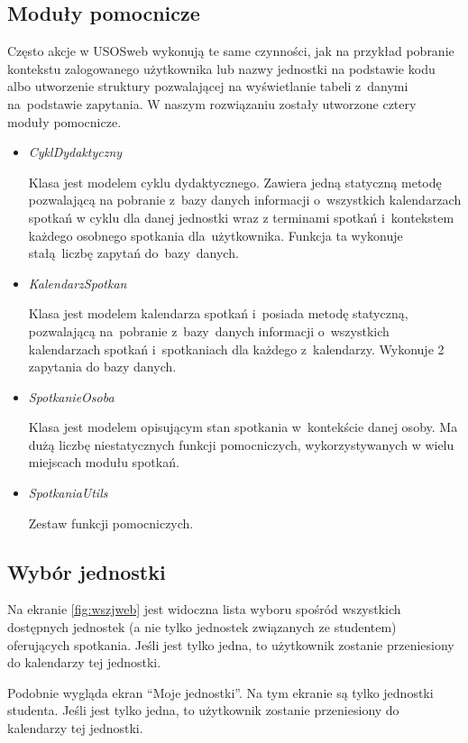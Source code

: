 \documentclass[licencjacka]{pracamgr}
\begin{document}
\subsection{Moduły pomocnicze}
Często akcje w USOSweb wykonują te same czynności, jak na przykład pobranie kontekstu zalogowanego użytkownika lub nazwy jednostki na podstawie kodu albo utworzenie struktury pozwalającej na wyświetlanie tabeli z~danymi na~podstawie zapytania.
W naszym rozwiązaniu zostały utworzone cztery moduły pomocnicze.
\begin{itemize}
\item{\textsl{CyklDydaktyczny}}

Klasa jest modelem cyklu dydaktycznego. Zawiera jedną statyczną metodę pozwalającą na pobranie z~bazy danych informacji o~wszystkich kalendarzach spotkań w cyklu dla danej jednostki wraz z terminami spotkań i~kontekstem każdego osobnego spotkania dla~użytkownika. Funkcja ta wykonuje stałą~liczbę zapytań do~bazy~danych.
\item{\textsl{KalendarzSpotkan}}

Klasa jest modelem kalendarza spotkań i~posiada metodę statyczną, pozwalającą na~pobranie z~bazy~danych informacji o~wszystkich kalendarzach spotkań i~spotkaniach dla każdego z~kalendarzy. Wykonuje 2 zapytania do bazy danych.
\item{\textsl{SpotkanieOsoba}}

Klasa jest modelem opisującym stan spotkania w~kontekście danej osoby. Ma dużą liczbę niestatycznych funkcji pomocniczych, wykorzystywanych w wielu miejscach modułu spotkań.
\item{\textsl{SpotkaniaUtils}}

Zestaw funkcji pomocniczych.
\end{itemize}

\subsection{Wybór jednostki}
Na ekranie \ref{fig:wszjweb} jest widoczna lista wyboru spośród wszystkich dostępnych jednostek (a nie tylko jednostek związanych ze studentem) oferujących spotkania. Jeśli jest tylko jedna, to użytkownik zostanie przeniesiony do kalendarzy tej jednostki. 

Podobnie wygląda ekran \enquote{Moje jednostki}. Na tym ekranie są tylko jednostki studenta. Jeśli jest tylko jedna, to użytkownik zostanie przeniesiony do kalendarzy tej jednostki.
\end{document}
